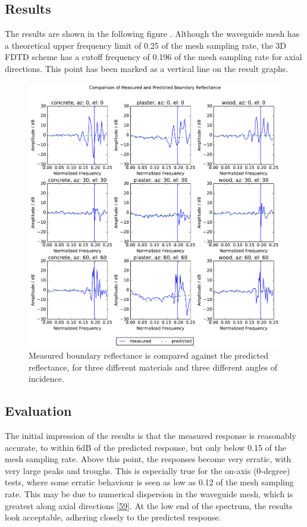 \documentclass[]{scrreprt}
\begin{document}
\subsection{Results}\label{results}

The results are shown in the following figure
\text{(\ref{fig:reflectance})}. Although the waveguide mesh has a
theoretical upper frequency limit of 0.25 of the mesh sampling rate, the
3D FDTD scheme has a cutoff frequency of 0.196 of the mesh sampling rate
for axial directions. This point has been marked as a vertical line on
the result graphs.

\begin{figure}[htbp]
\centering
\includegraphics{images/reflectance.pdf}
\caption{Measured boundary reflectance is compared against the predicted
reflectance, for three different materials and three different angles of
incidence.\label{fig:reflectance}}
\end{figure}

\subsection{Evaluation}\label{evaluation}

The initial impression of the results is that the measured response is
reasonably accurate, to within 6dB of the predicted response, but only
below 0.15 of the mesh sampling rate. Above this point, the responses
become very erratic, with very large peaks and troughs. This is
especially true for the on-axis (0-degree) tests, where some erratic
behaviour is seen as low as 0.12 of the mesh sampling rate. This may be
due to numerical dispersion in the waveguide mesh, which is greatest
along axial directions
{[}\protect\hyperlink{ref-kowalczykux5fmodelingux5f2008}{59}{]}. At the
low end of the spectrum, the results look acceptable, adhering closely
to the predicted response.
\end{document}
